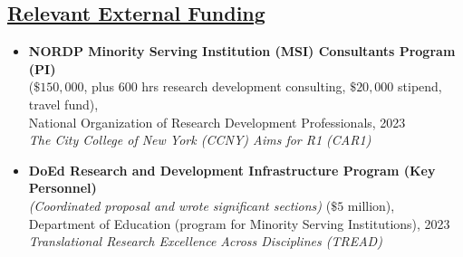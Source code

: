 \documentclass[]{res}
\begin{document}
\begin{resume}
\section{\underline{Relevant External Funding}} %
\begin{itemize} 
\item[] {\bf NORDP Minority Serving Institution (MSI) Consultants Program (PI)}\\ ($\$150,000$, plus 600 hrs research development consulting, $\$20,000$ stipend, travel fund),\\ National Organization of Research Development Professionals, 2023\\\emph{The City College of New York (CCNY) Aims for R1 (CAR1)}\\
\item[] {\bf DoEd Research and Development Infrastructure Program (Key Personnel)}\\ \emph{(Coordinated proposal and wrote significant sections)} ($\$5$ million),\\ Department of Education (program for Minority Serving Institutions), 2023\\\emph{Translational Research Excellence Across Disciplines (TREAD)}\\
\end{itemize} 


\end{resume} 
\end{document}
